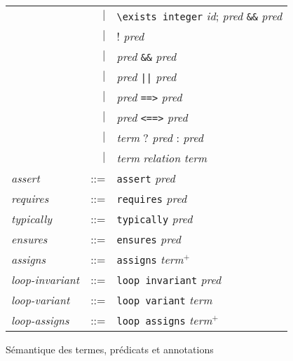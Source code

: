 \begin{figure}[tb]
\begin{tabular}{lrl}
    & $\mid$ & \lstinline'\exists integer' \textit{id};
    \textit{pred} \lstinline'&&' \textit{pred} \\
    & $\mid$ & ! \textit{pred} \\
    & $\mid$ & \textit{pred} \lstinline'&&' \textit{pred} \\
    & $\mid$ & \textit{pred} \lstinline'||' \textit{pred} \\
    & $\mid$ & \textit{pred} \lstinline'==>' \textit{pred} \\
    & $\mid$ & \textit{pred} \lstinline'<==>' \textit{pred} \\
    & $\mid$ & \textit{term} ? \textit{pred} : \textit{pred} \\
    & $\mid$ & \textit{term} \textit{relation} \textit{term} \\
    \textit{assert} & ::= & \lstinline'assert' \textit{pred} \\
    \textit{requires} & ::= & \lstinline'requires' \textit{pred} \\
    \textit{typically} & ::= & \lstinline'typically' \textit{pred} \\
    \textit{ensures} & ::= & \lstinline'ensures' \textit{pred} \\
    \textit{assigns} & ::= & \lstinline'assigns' \textit{term}$^{+}$ \\
    \textit{loop-invariant} & ::= & \lstinline'loop invariant' \textit{pred} \\
    \textit{loop-variant} & ::= & \lstinline'loop variant' \textit{term} \\
    \textit{loop-assigns} & ::= & \lstinline'loop assigns' \textit{term}$^{+}$
  \end{tabular}
  \label{fig:sem-eacsl}
  \caption{Sémantique des termes, prédicats et annotations \eacsl}
\end{figure}

